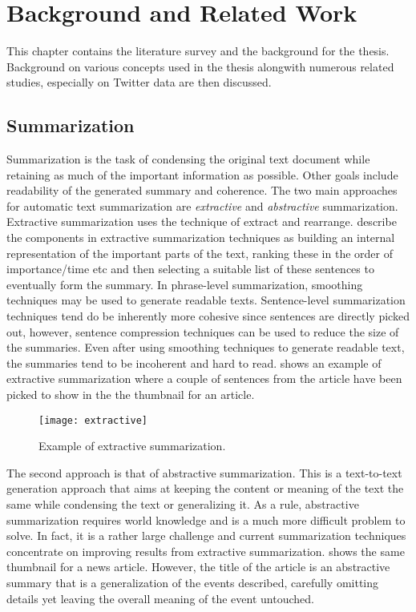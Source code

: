 \chapter{Background and Related Work}
\label{chap:background}

This chapter contains the literature survey and the background for the thesis. Background on various concepts used in the thesis alongwith numerous related studies, especially on Twitter data are then discussed.


\section{Summarization}

Summarization is the task of condensing the original text document while retaining as much of the important information as possible. Other goals include readability of the generated summary and coherence. The two main approaches for automatic text summarization are \textit{extractive} and \textit{abstractive} summarization. Extractive summarization uses the technique of extract and rearrange. \cite{nenkova2012survey} describe the components in extractive summarization techniques as building an internal representation of the important parts of the text, ranking these in the order of importance/time etc and then selecting a suitable list of these sentences to eventually form the summary. In phrase-level summarization, smoothing techniques may be used to generate readable texts. Sentence-level summarization techniques tend do be inherently more cohesive since sentences are directly picked out, however, sentence compression techniques can be used to reduce the size of the summaries. Even after using smoothing techniques to generate readable text, the summaries tend to be incoherent and hard to read.  shows an example of extractive summarization where a couple of sentences from the article have been picked to show in the the thumbnail for an article.

\begin{figure}[!htbp]
\centering
\texttt{[image: extractive]}
\caption{Example of extractive summarization.}
\label{fig:extractive}
\end{figure}


The second approach is that of abstractive summarization. This is a text-to-text generation approach that aims at keeping the content or meaning of the text the same while condensing the text or generalizing it. As a rule, abstractive summarization requires world knowledge and is a much more difficult problem to solve. In fact, it is a rather large challenge and current summarization techniques concentrate on improving results from extractive summarization.  shows the same thumbnail for a news article. However, the title of the article is an abstractive summary that is a generalization of the events described, carefully omitting details yet leaving the overall meaning of the event untouched.

